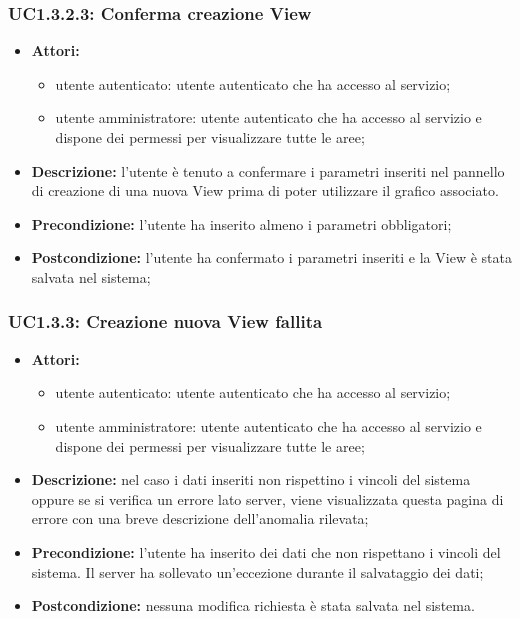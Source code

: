 \subsubsection{UC1.3.2.3: Conferma creazione View}

\begin{itemize}
    \item \textbf{Attori:}
    \begin{itemize}
    	\item utente autenticato: utente autenticato che ha accesso al servizio;
    	\item utente amministratore: utente autenticato che ha accesso al servizio e dispone dei permessi per visualizzare tutte le aree;
	\end{itemize}
    \item \textbf{Descrizione:} l'utente è tenuto a confermare i parametri inseriti nel pannello di creazione di una nuova View prima di poter utilizzare il grafico associato.
    \item \textbf{Precondizione:} l'utente ha inserito almeno i parametri obbligatori;
    \item \textbf{Postcondizione:} l'utente ha confermato i parametri inseriti e la View è stata salvata nel sistema;
\end{itemize}

\subsubsection{UC1.3.3: Creazione nuova View fallita}

\begin{itemize}
   	\item \textbf{Attori:}
    \begin{itemize}
    	\item utente autenticato: utente autenticato che ha accesso al servizio;
    	\item utente amministratore: utente autenticato che ha accesso al servizio e dispone dei permessi per visualizzare tutte le aree;
	\end{itemize}
    \item \textbf{Descrizione:} nel caso i dati inseriti non rispettino i vincoli del sistema oppure se si verifica un errore lato server, viene visualizzata questa pagina di errore con una breve descrizione dell'anomalia rilevata;
    \item \textbf{Precondizione:} l'utente ha inserito dei dati che non rispettano i vincoli del sistema. Il server ha sollevato un'eccezione durante il salvataggio dei dati;
    \item \textbf{Postcondizione:} nessuna modifica richiesta è stata salvata nel sistema.
\end{itemize}

